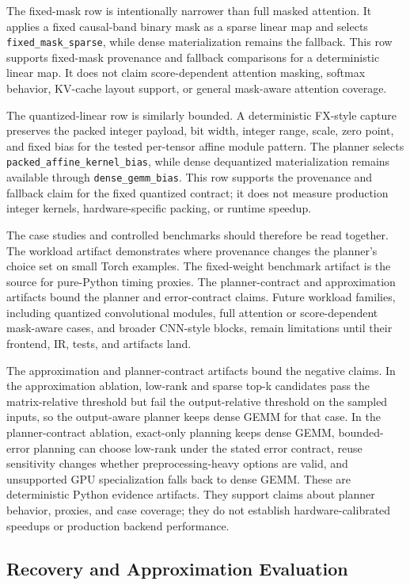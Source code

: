 \documentclass[11pt]{article}
\begin{document}
The fixed-mask row is intentionally narrower than full masked attention. It
applies a fixed causal-band binary mask as a sparse linear map and selects
\texttt{fixed\_mask\_sparse}, while dense materialization remains the fallback.
This row supports fixed-mask provenance and fallback comparisons for a
deterministic linear map. It does not claim score-dependent attention masking,
softmax behavior, KV-cache layout support, or general mask-aware attention
coverage.

The quantized-linear row is similarly bounded. A deterministic FX-style capture
preserves the packed integer payload, bit width, integer range, scale, zero
point, and fixed bias for the tested per-tensor affine module pattern. The
planner selects \texttt{packed\_affine\_kernel\_bias}, while dense dequantized
materialization remains available through \texttt{dense\_gemm\_bias}. This row
supports the provenance and fallback claim for the fixed quantized contract; it
does not measure production integer kernels, hardware-specific packing, or
runtime speedup.

The case studies and controlled benchmarks should therefore be read together.
The workload artifact demonstrates where provenance changes the planner's
choice set on small Torch examples. The fixed-weight benchmark artifact is the
source for pure-Python timing proxies. The planner-contract and approximation
artifacts bound the planner and error-contract claims. Future workload
families, including quantized convolutional modules, full attention or
score-dependent mask-aware cases, and broader CNN-style blocks, remain
limitations until their frontend, IR, tests, and artifacts land.

The approximation and planner-contract artifacts bound the negative claims. In
the approximation ablation, low-rank and sparse top-k candidates pass the
matrix-relative threshold but fail the output-relative threshold on the sampled
inputs, so the output-aware planner keeps dense GEMM for that case. In the
planner-contract ablation, exact-only planning keeps dense GEMM, bounded-error
planning can choose low-rank under the stated error contract, reuse sensitivity
changes whether preprocessing-heavy options are valid, and unsupported GPU
specialization falls back to dense GEMM. These are deterministic Python
evidence artifacts. They support claims about planner behavior, proxies, and
case coverage; they do not establish hardware-calibrated speedups or production
backend performance.

\subsection{Recovery and Approximation Evaluation}
\end{document}
